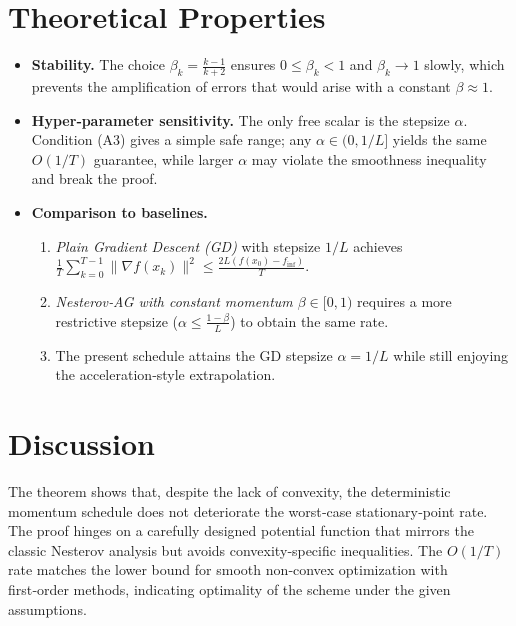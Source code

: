 \documentclass{article}
\begin{document}
\section*{Theoretical Properties}
\begin{itemize}
\item \textbf{Stability.} The choice $\beta_k=\frac{k-1}{k+2}$ ensures $0\le\beta_k<1$ and $\beta_k\to1$ slowly, which prevents the amplification of errors that would arise with a constant $\beta\approx1$.
\item \textbf{Hyper‑parameter sensitivity.} The only free scalar is the stepsize $\alpha$. Condition (A3) gives a simple safe range; any $\alpha\in(0,1/L]$ yields the same $O(1/T)$ guarantee, while larger $\alpha$ may violate the smoothness inequality and break the proof.
\item \textbf{Comparison to baselines.}
    \begin{enumerate}
        \item \textit{Plain Gradient Descent (GD)} with stepsize $1/L$ achieves $\frac{1}{T}\sum_{k=0}^{T-1}\|\nabla f(x_k)\|^2\le \frac{2L(f(x_0)-f_{\inf})}{T}$.
        \item \textit{Nesterov‑AG with constant momentum $\beta\in[0,1)$} requires a more restrictive stepsize ($\alpha\le \frac{1-\beta}{L}$) to obtain the same rate.
        \item The present schedule attains the GD stepsize $\alpha=1/L$ while still enjoying the acceleration‐style extrapolation.
    \end{enumerate}
\end{itemize}

\section*{Discussion}
The theorem shows that, despite the lack of convexity, the deterministic momentum schedule does not deteriorate the worst‑case stationary‑point rate. The proof hinges on a carefully designed potential function that mirrors the classic Nesterov analysis but avoids convexity‑specific inequalities. The $O(1/T)$ rate matches the lower bound for smooth non‑convex optimization with first‑order methods, indicating optimality of the scheme under the given assumptions.

\newpage
\end{document}
